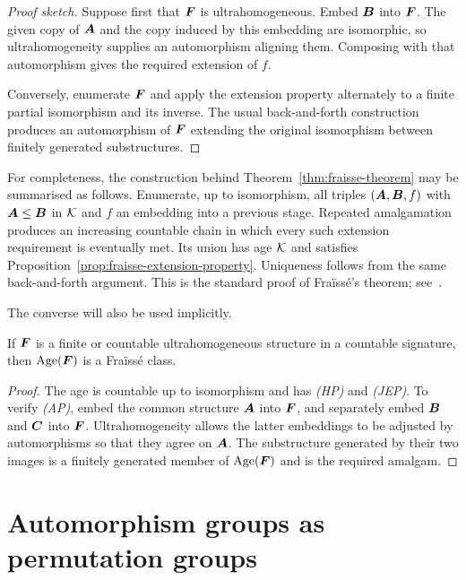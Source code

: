 \begin{proof}[Proof sketch]
    Suppose first that \(\boldsymbol{F}\) is ultrahomogeneous.  Embed \(\boldsymbol{B}\) into \(\boldsymbol{F}\).
    The given copy of \(\boldsymbol{A}\) and the copy induced by this embedding are
    isomorphic, so ultrahomogeneity supplies an automorphism aligning them.
    Composing with that automorphism gives the required extension of \(f\).

    Conversely, enumerate \(\boldsymbol{F}\) and apply the extension property alternately
    to a finite partial isomorphism and its inverse.  The usual back-and-forth
    construction produces an automorphism of \(\boldsymbol{F}\) extending the original
    isomorphism between finitely generated substructures.
\end{proof}

For completeness, the construction behind Theorem~\ref{thm:fraisse-theorem}
may be summarised as follows.  Enumerate, up to isomorphism, all triples
\((\boldsymbol{A},\boldsymbol{B},f)\) with \(\boldsymbol{A}\leq \boldsymbol{B}\) in \(\mathcal{K}\) and \(f\) an embedding into a
previous stage.  Repeated amalgamation produces an increasing countable chain
in which every such extension requirement is eventually met.  Its union has
age \(\mathcal{K}\) and satisfies
Proposition~\ref{prop:fraisse-extension-property}.  Uniqueness follows from
the same back-and-forth argument.  This is the standard proof of Fraïssé's
theorem; see~\cite{Fr}.

The converse will also be used implicitly.

\begin{theorem}
    \label{thm:converse-fraisse}
    If \(\boldsymbol{F}\) is a finite or countable ultrahomogeneous structure in a
    countable signature, then \(\operatorname{Age}(\boldsymbol{F})\) is a Fraïssé class.
\end{theorem}

\begin{proof}
    The age is countable up to isomorphism and has \emph{(HP)} and
    \emph{(JEP)}.  To verify \emph{(AP)}, embed the common structure
    \(\boldsymbol{A}\) into \(\boldsymbol{F}\), and separately embed \(\boldsymbol{B}\) and \(\boldsymbol{C}\) into \(\boldsymbol{F}\).
    Ultrahomogeneity allows the latter embeddings to be adjusted by
    automorphisms so that they agree on \(\boldsymbol{A}\).  The substructure generated by
    their two images is a finitely generated member of \(\operatorname{Age}(\boldsymbol{F})\) and is the
    required amalgam.
\end{proof}

\section{Automorphism groups as permutation groups}

